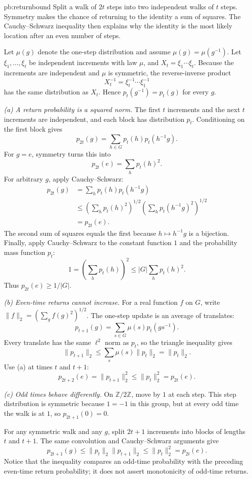 \begin{solution}{pb:returnbound}
\idea Split a walk of $2t$ steps into two independent walks of $t$ steps. Symmetry makes the chance of returning to the identity a sum of squares. The Cauchy--Schwarz inequality then explains why the identity is the most likely location after an even number of steps.

\writeup Let $\mu(g)$ denote the one-step distribution and assume $\mu(g)=\mu(g^{-1})$. Let $\xi_1,\ldots,\xi_t$ be independent increments with law $\mu$, and $X_t=\xi_1\cdots\xi_t$. Because the increments are independent and $\mu$ is symmetric, the reverse-inverse product
\[
X_t^{-1}=\xi_t^{-1}\cdots\xi_1^{-1}
\]
has the same distribution as $X_t$. Hence $p_t(g^{-1})=p_t(g)$ for every $g$.

\emph{(a) A return probability is a squared norm.}
The first $t$ increments and the next $t$ increments are independent, and each block has distribution $p_t$. Conditioning on the first block gives
\[
p_{2t}(g)=\sum_{h\in G}p_t(h)p_t(h^{-1}g).
\]
For $g=e$, symmetry turns this into
\[
\boxed{p_{2t}(e)=\sum_h p_t(h)^2.}
\]
For arbitrary $g$, apply Cauchy--Schwarz:
\[
\begin{aligned}
p_{2t}(g)
&=\sum_h p_t(h)p_t(h^{-1}g)\\
&\le\left(\sum_h p_t(h)^2\right)^{1/2}
 \left(\sum_h p_t(h^{-1}g)^2\right)^{1/2}\\
&=p_{2t}(e).
\end{aligned}
\]
The second sum of squares equals the first because $h\mapsto h^{-1}g$ is a bijection. Finally, apply Cauchy--Schwarz to the constant function $1$ and the probability mass function $p_t$:
\[
1=\left(\sum_hp_t(h)\right)^2
\le |G|\sum_hp_t(h)^2.
\]
Thus $\boxed{p_{2t}(e)\ge1/|G|}$.

\emph{(b) Even-time returns cannot increase.}
For a real function $f$ on $G$, write $\|f\|_2=(\sum_g f(g)^2)^{1/2}$. The one-step update is an average of translates:
\[
p_{t+1}(g)=\sum_{s\in G}\mu(s)p_t(gs^{-1}).
\]
Every translate has the same $\ell^2$ norm as $p_t$, so the triangle inequality gives
\[
\|p_{t+1}\|_2\le\sum_s\mu(s)\|p_t\|_2=\|p_t\|_2.
\]
Use (a) at times $t$ and $t+1$:
\[
\boxed{p_{2t+2}(e)=\|p_{t+1}\|_2^2
\le\|p_t\|_2^2=p_{2t}(e).}
\]

\emph{(c) Odd times behave differently.}
On $\mathbb Z/2\mathbb Z$, move by $1$ at each step. This step distribution is symmetric because $1=-1$ in this group, but at every odd time the walk is at $1$, so $p_{2t+1}(0)=0$.

For any symmetric walk and any $g$, split $2t+1$ increments into blocks of lengths $t$ and $t+1$. The same convolution and Cauchy--Schwarz arguments give
\[
p_{2t+1}(g)\le\|p_t\|_2\|p_{t+1}\|_2
\le\|p_t\|_2^2
=\boxed{p_{2t}(e)}.
\]
Notice that the inequality compares an odd-time probability with the preceding even-time return probability; it does not assert monotonicity of odd-time returns.


\end{solution}
